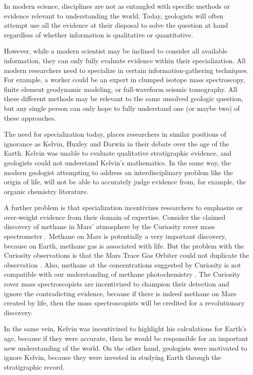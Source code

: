 \documentclass[12pt]{article}
\begin{document}
In modern science, disciplines are not as entangled with specific methods or evidence relevant to understanding the world. Today, geologists will often attempt use all the evidence at their disposal to solve the question at hand regardless of whether information is qualitative or quantitative.

However, while a modern scientist may be inclined to consider all available information, they can only fully evaluate evidence within their specialization. All modern researchers need to specialize in certain information-gathering techniques. For example, a worker could be an expert in clumped isotope mass spectroscopy, finite element geodynamic modeling, or full-waveform seismic tomography. All these different methods may be relevant to the same unsolved geologic question, but any single person can only hope to fully understand one (or maybe two) of these approaches. 

The need for specialization today, places researchers in similar positions of ignorance as Kelvin, Huxley and Darwin in their debate over the age of the Earth. Kelvin was unable to evaluate qualitative stratigraphic evidence, and geologists could not understand Kelvin's mathematics. In the same way, the modern geologist attempting to address an interdisciplinary problem like the origin of life, will not be able to accurately judge evidence from, for example, the organic chemistry literature.

A further problem is that specialization incentivizes researchers to emphasize or over-weight evidence from their domain of expertise. Consider the claimed discovery of methane in Mars' atmosphere by the Curiosity rover mass spectrometer \citep{Webster_2015}. Methane on Mars is potentially a very important discovery, because on Earth, methane gas is associated with life. But the problem with the Curiosity observations is that the Mars Trace Gas Orbiter could not duplicate the observation \citep{Korablev_2019}. Also, methane at the concentrations suggested by Curiosity is not compatible with our understanding of methane photochemistry \citep{Lefevre_2009}. The Curiosity rover mass spectroscopists are incentivized to champion their detection and ignore the contradicting evidence, because if there is indeed methane on Mars created by life, then the mass spectroscopists will be credited for a revolutionary discovery.

In the same vein, Kelvin was incentivized to highlight his calculations for Earth's age, because if they were accurate, then he would be responsible for an important new understanding of the world. On the other hand, geologists were motivated to ignore Kelvin, because they were invested in studying Earth through the stratigraphic record.
\end{document}
